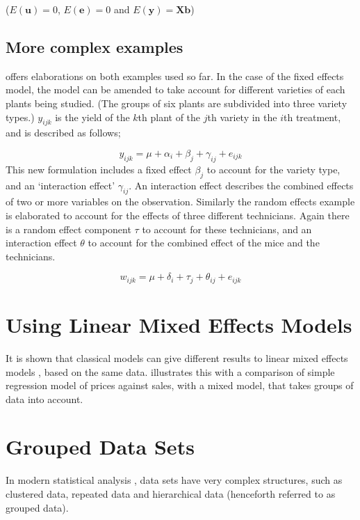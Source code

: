 \documentclass[12pt, a4paper]{report}
\theoremstyle{plain}
\theoremstyle{definition}
\theoremstyle{remark}
\begin{document}
($E(\textbf{u})=0$, $E(\textbf{e})=0 $ and $E(\textbf{y}) =
\textbf{Xb}$)



\subsection{More complex examples}
\citet{Searle} offers elaborations on both examples used so far.
In the case of the fixed effects model, the model can be amended
to take account for different varieties of each plants being
studied. (The groups of six plants are subdivided into three
variety types.) $y_{ijk}$ is the yield of the $k$th plant of the
$j$th variety in the $i$th treatment, and is described as follows;

\begin{equation}
y_{ijk} = \mu + \alpha_{i} + \beta_{j} + \gamma_{ij} + e_{ijk}
\end{equation}
This new formulation includes a fixed effect $\beta_{j}$ to
account for the variety type, and an `interaction effect'
$\gamma_{ij}$. An interaction effect describes the combined
effects of two or more variables on the observation. Similarly the
random effects example is elaborated to account for the effects of
three different technicians. Again there is a random effect
component $\tau$ to account for these technicians, and an
interaction effect $\theta$ to account for the combined effect of
the mice and the technicians.

\begin{equation}
w_{ijk} = \mu + \delta_{i} + \tau_{j} + \theta_{ij} + e_{ijk}
\end{equation}

\section{Using Linear Mixed Effects Models} It is shown that
classical models can give different results to linear mixed
effects models , based on the same data. \citet{Demi} illustrates
this with a comparison of simple regression model of prices
against sales, with a mixed model, that takes groups of data into
account.


\section{Grouped Data Sets}
In modern statistical analysis , data sets have very complex
structures, such as  clustered data, repeated data and
hierarchical data (henceforth referred to as grouped data).
\end{document}
